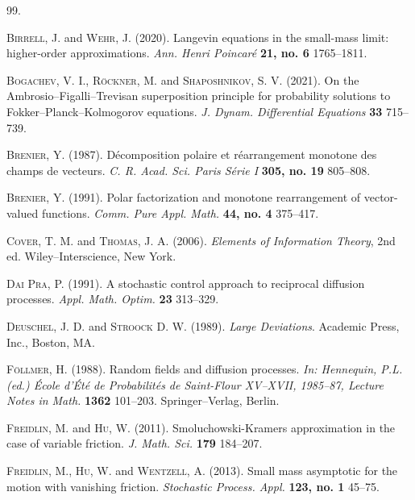 \documentclass[12pt]{article}
\begin{document}
\begin{thebibliography}{99.}%

\textsc{Birrell, J.} and \textsc{Wehr, J.} (2020).
Langevin equations in the small-mass limit: higher-order approximations.
\textit{Ann. Henri Poincar\'e} 
\textbf{21, no. 6} 1765--1811.

\textsc{Bogachev, V. I.}, \textsc{R\"ockner, M.} and \textsc{Shaposhnikov, S. V.}
 (2021).
On the Ambrosio--Figalli--Trevisan superposition principle for probability solutions to Fokker--Planck--Kolmogorov equations.
\textit{J. Dynam. Differential Equations} \textbf{33} 715--739.


\textsc{Brenier, Y.} (1987).
D\'ecomposition polaire et r\'earrangement monotone des champs de vecteurs. 
\textit{C. R. Acad. Sci. Paris S\'erie I } \textbf{305, no. 19} 805--808.

\textsc{Brenier, Y.} (1991).
Polar factorization and monotone rearrangement of vector-valued functions.
\textit{Comm. Pure Appl. Math.} \textbf{44,  no. 4} 375--417.

\textsc{Cover, T. M.} and \textsc{Thomas, J. A.} (2006).
\textit{Elements of Information Theory}, 2nd ed. 
Wiley--Interscience, New York.

\textsc{Dai Pra, P.} (1991).
A stochastic control approach to reciprocal diffusion processes.
\textit{Appl. Math. Optim.}  \textbf{23} 313--329.

\textsc{Deuschel, J. D.} and \textsc{Stroock} D. W. (1989).
\textit{Large Deviations}.
Academic Press, Inc., Boston, MA.


\textsc{F\"ollmer, H.} (1988).
Random fields and diffusion processes.
\textit{In: Hennequin, P.L. (ed.)
\'Ecole d'\'Et\'e de Probabilit\'es de Saint-Flour XV--XVII, 1985--87,  Lecture Notes in Math.}  \textbf{1362} 101--203.
Springer--Verlag, Berlin.

\textsc{Freidlin, M.} and \textsc{Hu, W.} (2011).
Smoluchowski-Kramers approximation in the case of variable friction.
\textit{J. Math. Sci.} \textbf{179} 184--207.

\textsc{Freidlin, M.}, \textsc{Hu, W.} and \textsc{Wentzell, A.} (2013).
Small mass asymptotic for the motion with vanishing friction.
\textit{Stochastic Process. Appl.} \textbf{123, no. 1} 45--75.



\end{thebibliography}
\end{document}

